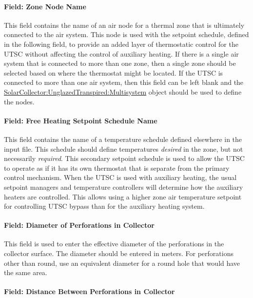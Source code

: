 \paragraph{Field: Zone Node Name}\label{field-zone-node-name-001}

This field contains the name of an air node for a thermal zone that is ultimately connected to the air system. This node is used with the setpoint schedule, defined in the following field, to provide an added layer of thermostatic control for the UTSC without affecting the control of auxiliary heating. If there is a single air system that is connected to more than one zone, then a single zone should be selected based on where the thermostat might be located. If the UTSC is connected to more than one air system, then this field can be left blank and the \hyperref[solarcollectorunglazedtranspiredmultisystem]{SolarCollector:UnglazedTranspired:Multisystem} object should be used to define the nodes.

\paragraph{Field: Free Heating Setpoint Schedule Name}\label{field-free-heating-setpoint-schedule-name}

This field contains the name of a temperature schedule defined elsewhere in the input file. This schedule should define temperatures \emph{desired} in the zone, but not necessarily \emph{required}. This secondary setpoint schedule is used to allow the UTSC to operate as if it has its own thermostat that is separate from the primary control mechanism. When the UTSC is used with auxiliary heating, the usual setpoint managers and temperature controllers will determine how the auxiliary heaters are controlled. This allows using a higher zone air temperature setpoint for controlling UTSC bypass than for the auxiliary heating system.

\paragraph{Field: Diameter of Perforations in Collector}\label{field-diameter-of-perforations-in-collector}

This field is used to enter the effective diameter of the perforations in the collector surface. The diameter should be entered in meters. For perforations other than round, use an equivalent diameter for a round hole that would have the same area.

\paragraph{Field: Distance Between Perforations in Collector}\label{field-distance-between-perforations-in-collector}

